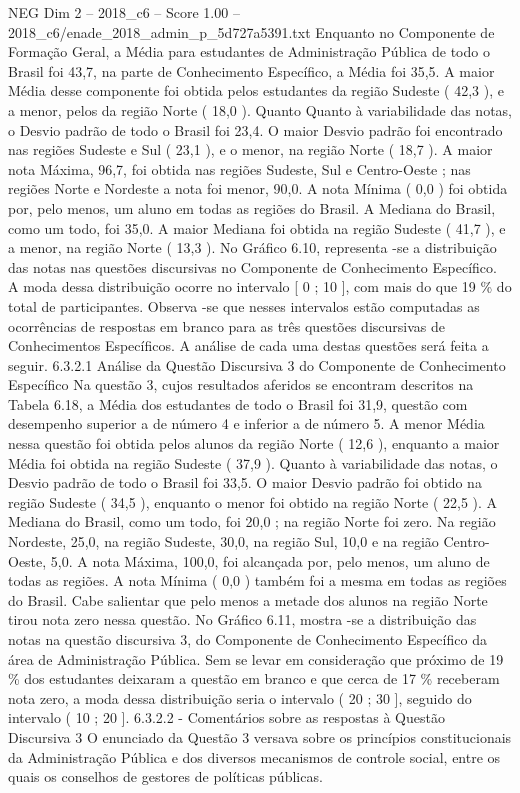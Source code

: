 \begin{textsample}{NEG Dim 2 – 2018\_c6 – Score 1.00 – 2018\_c6/enade\_2018\_admin\_p\_5d727a5391.txt}
Enquanto no Componente de Formação Geral, a Média para estudantes de Administração Pública de todo o Brasil foi 43,7, na parte de Conhecimento Específico, a Média foi 35,5.
A maior Média desse componente foi obtida pelos estudantes da região Sudeste ( 42,3 ), e a menor, pelos da região Norte ( 18,0 ).
Quanto Quanto à variabilidade das notas, o Desvio padrão de todo o Brasil foi 23,4.
O maior Desvio padrão foi encontrado nas regiões Sudeste e Sul ( 23,1 ), e o menor, na região Norte ( 18,7 ).
A maior nota Máxima, 96,7, foi obtida nas regiões Sudeste, Sul e Centro-Oeste ; nas regiões Norte e Nordeste a nota foi menor, 90,0.
A nota Mínima ( 0,0 ) foi obtida por, pelo menos, um aluno em todas as regiões do Brasil.
A Mediana do Brasil, como um todo, foi 35,0.
A maior Mediana foi obtida na região Sudeste ( 41,7 ), e a menor, na região Norte ( 13,3 ).
No Gráfico 6.10, representa -se a distribuição das notas nas questões discursivas no Componente de Conhecimento Específico.
A moda dessa distribuição ocorre no intervalo [ 0 ; 10 ], com mais do que 19 \% do total de participantes.
Observa -se que nesses intervalos estão computadas as ocorrências de respostas em branco para as três questões discursivas de Conhecimentos Específicos.
A análise de cada uma destas questões será feita a seguir. 6.3.2.1 Análise da Questão Discursiva 3 do Componente de Conhecimento Específico Na questão 3, cujos resultados aferidos se encontram descritos na Tabela 6.18, a Média dos estudantes de todo o Brasil foi 31,9, questão com desempenho superior a de número 4 e inferior a de número 5.
A menor Média nessa questão foi obtida pelos alunos da região Norte ( 12,6 ), enquanto a maior Média foi obtida na região Sudeste ( 37,9 ).
Quanto à variabilidade das notas, o Desvio padrão de todo o Brasil foi 33,5.
O maior Desvio padrão foi obtido na região Sudeste ( 34,5 ), enquanto o menor foi obtido na região Norte ( 22,5 ).
A Mediana do Brasil, como um todo, foi 20,0 ; na região Norte foi zero.
Na região Nordeste, 25,0, na região Sudeste, 30,0, na região Sul, 10,0 e na região Centro-Oeste, 5,0.
A nota Máxima, 100,0, foi alcançada por, pelo menos, um aluno de todas as regiões.
A nota Mínima ( 0,0 ) também foi a mesma em todas as regiões do Brasil.
Cabe salientar que pelo menos a metade dos alunos na região Norte tirou nota zero nessa questão.
No Gráfico 6.11, mostra -se a distribuição das notas na questão discursiva 3, do Componente de Conhecimento Específico da área de Administração Pública.
Sem se levar em consideração que próximo de 19 \% dos estudantes deixaram a questão em branco e que cerca de 17 \% receberam nota zero, a moda dessa distribuição seria o intervalo ( 20 ; 30 ], seguido do intervalo ( 10 ; 20 ]. 6.3.2.2 - Comentários sobre as respostas à Questão Discursiva 3 O enunciado da Questão 3 versava sobre os princípios constitucionais da Administração Pública e dos diversos mecanismos de controle social, entre os quais os conselhos de gestores de políticas públicas.

\end{textsample}
